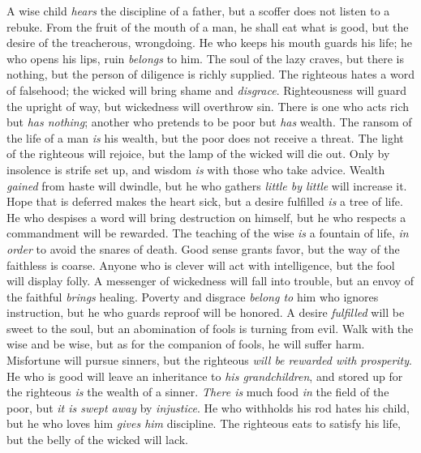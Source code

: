 \begin{biblechapter} %
\verse A wise child \textit{hears} the discipline of a father, 
but a scoffer does not listen to a rebuke.
\verse From the fruit of the mouth of a man, he shall eat what is good, 
but the desire of the treacherous, wrongdoing.
\verse He who keeps his mouth guards his life; 
he who opens his lips, ruin \textit{belongs} to him.
\verse The soul of the lazy craves, but there is nothing, 
but the person of diligence is richly supplied.
\verse The righteous hates a word of falsehood; 
the wicked will bring shame and \textit{disgrace}.
\verse Righteousness will guard the upright of way, 
but wickedness will overthrow sin.
\verse There is one who acts rich but \textit{has nothing}; 
another who pretends to be poor but \textit{has} wealth.
\verse The ransom of the life of a man \textit{is} his wealth, 
but the poor does not receive a threat.
\verse The light of the righteous will rejoice, 
but the lamp of the wicked will die out.
\verse Only by insolence is strife set up, 
and wisdom \textit{is} with those who take advice.
\verse Wealth \textit{gained} from haste will dwindle, 
but he who gathers \textit{little by little} will increase it.
\verse Hope that is deferred makes the heart sick, 
but a desire fulfilled \textit{is} a tree of life.
\verse He who despises a word will bring destruction on himself, 
but he who respects a commandment will be rewarded.
\verse The teaching of the wise \textit{is} a fountain of life, 
\textit{in order} to avoid the snares of death.
\verse Good sense grants favor, 
but the way of the faithless is coarse.
\verse Anyone who is clever will act with intelligence, 
but the fool will display folly.
\verse A messenger of wickedness will fall into trouble, 
but an envoy of the faithful \textit{brings} healing.
\verse Poverty and disgrace \textit{belong to} him who ignores instruction, 
but he who guards reproof will be honored.
\verse A desire \textit{fulfilled} will be sweet to the soul, 
but an abomination of fools is turning from evil.
\verse Walk with the wise and be wise, 
but as for the companion of fools, he will suffer harm.
\verse Misfortune will pursue sinners, 
but the righteous \textit{will be rewarded with prosperity}.
\verse He who is good will leave an inheritance to \textit{his grandchildren}, 
and stored up for the righteous \textit{is} the wealth of a sinner.
\verse \textit{There is} much food \textit{in} the field of the poor, 
but \textit{it is swept away} by \textit{injustice}.
\verse He who withholds his rod hates his child, 
but he who loves him \textit{gives him} discipline.
\verse The righteous eats to satisfy his life, 
but the belly of the wicked will lack.
\end{biblechapter}

